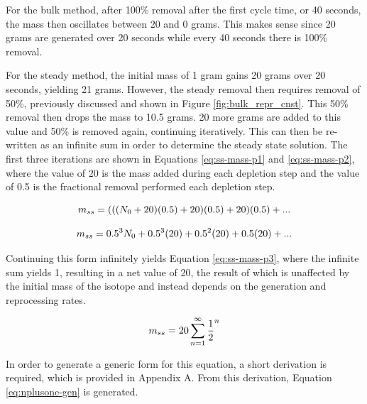 For the bulk method, after 100\% removal after the first cycle time, or 40 seconds, the mass then oscillates between 20 and 0 grams. This makes sense since 20 grams are generated over 20 seconds while every 40 seconds there is 100\% removal. 

For the steady method, the initial mass of 1 gram gains 20 grams over 20 seconds, yielding 21 grams. However, the steady removal then requires removal of 50\%, previously discussed and shown in Figure \ref{fig:bulk_repr_cnst}. This 50\% removal then drops the mass to 10.5 grams. 20 more grams are added to this value and 50\% is removed again, continuing iteratively. This can then be re-written as an infinite sum in order to determine the steady state solution. The first three iterations are shown in Equations \eqref{eq:ss-mass-p1} and \eqref{eq:ss-mass-p2}, where the value of 20 is the mass added during each depletion step and the value of 0.5 is the fractional removal performed each depletion step. 


\begin{equation} \hfill 
m_{ss} = (((N_0+20)(0.5)+20)(0.5)+20)(0.5) + ...
\hfill\label{eq:ss-mass-p1} \end{equation}

\begin{equation} \hfill 
m_{ss} = 0.5^3 N_0 + 0.5^3 (20) + 0.5^2 (20) + 0.5 (20) + ...
\hfill\label{eq:ss-mass-p2} \end{equation}

Continuing this form infinitely yields Equation \eqref{eq:ss-mass-p3}, where the infinite sum yields 1, resulting in a net value of 20, the result of which is unaffected by the initial mass of the isotope and instead depends on the generation and reprocessing rates.

\begin{equation} \hfill 
m_{ss} = 20 \sum_{n=1}^\infty \frac{1}{2}^n 
\hfill\label{eq:ss-mass-p3} \end{equation}

In order to generate a generic form for this equation, a short derivation is required, which is provided in Appendix A. From this derivation, Equation \eqref{eq:nplusone-gen} is generated.

